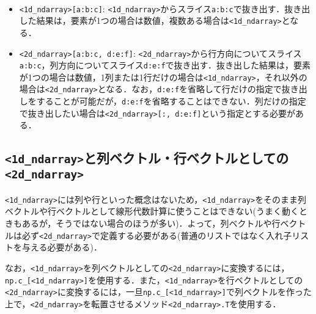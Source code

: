 \begin{gram}　
\begin{itemize}
\item \texttt{<1d\_ndarray>[a:b:c]}: \texttt{<1d\_ndarray>}からスライス\texttt{a:b:c}で抜き出す．抜き出した結果は，要素が1つの場合は数値，複数ある場合は\texttt{<1d\_ndarray>}となる．
\item \texttt{<2d\_ndarray>[a:b:c, d:e:f]}: \texttt{<2d\_ndarray>}から行方向についてスライス\texttt{a:b:c}，列方向についてスライス\texttt{d:e:f}で抜き出す．抜き出した結果は，要素が1つの場合は数値，1列または1行だけの場合は\texttt{<1d\_ndarray>}，それ以外の場合は\texttt{<2d\_ndarray>}となる．なお，\texttt{d:e:f}を省略して行だけの指定で抜き出しをすることが可能だが，\texttt{d:e:f}を省略することはできない．列だけの指定で抜き出したい場合は\texttt{<2d\_ndarray>[:, d:e:f]}という指定とする必要がある．
\end{itemize}
\end{gram}

\begin{cod}[\texttt{num5.py}]　
}]{code/num5.py}
\vspace{-7pt}
\begin{lstlisting}
array_1d[1::2]=[2 4]
array_2d[::2,::2]=[[1 3]
 [7 9]]
array_2d[3]=[10 11 12],shape=(3,)
array_2d[:,1]=[ 2  5  8 11],shape=(4,)
\end{lstlisting}
\end{cod}
\vspace{-10pt}

\subsection{\texttt{<1d\_ndarray>}と列ベクトル・行ベクトルとしての\texttt{<2d\_ndarray>}}

\texttt{<1d\_ndarray>}には列や行といった概念はないため，\texttt{<1d\_ndarray>}をそのまま列ベクトルや行ベクトルとして線形代数計算に使うことはできない(うまく動くときもあるが，そうではない場合のほうが多い)．よって，列ベクトルや行ベクトルは必ず\texttt{<2d\_ndarray>}で定義する必要がある(普通のリストではなく入れ子リストを与える必要がある)．

なお，\texttt{<1d\_ndarray>}を列ベクトルとしての\texttt{<2d\_ndarray>}に変換するには，\texttt{np.c\_[<1d\_ndarray>]}を使用する．また，\texttt{<1d\_ndarray>}を行ベクトルとしての\texttt{<2d\_ndarray>}に変換するには，一旦\texttt{np.c\_[<1d\_ndarray>]}で列ベクトルを作った上で，\texttt{<2d\_ndarray>}を転置させるメソッド\texttt{<2d\_ndarray>.T}を使用する．

